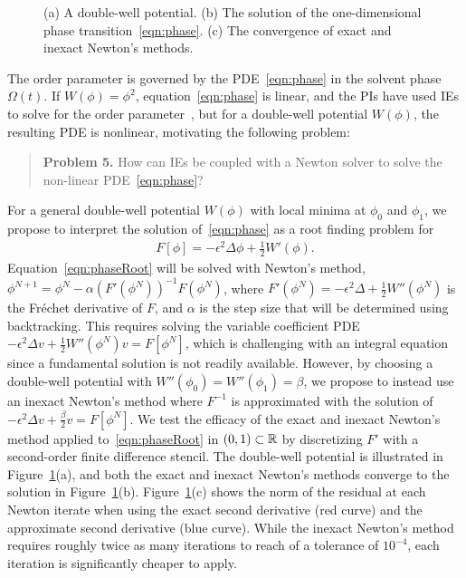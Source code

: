\begin{figure}
  \vspace{-8pt}
  \centering
   
  \caption{\label{fig:CA} \footnotesize (a) A double-well potential. (b)
  The solution of the one-dimensional phase
  transition~\eqref{eqn:phase}. (c) The convergence of exact and inexact
  Newton's methods.}
\end{figure}

The order parameter is governed by the PDE~\eqref{eqn:phase} in the
solvent phase $\Omega(t)$. If $W(\phi) = \phi^2$,
equation~\eqref{eqn:phase} is linear, and the PIs have used IEs to solve
for the order parameter~\cite{Fu2018_SIAM, FuQuRyYo22,
fu-ryh-qua-you2022}, but for a double-well potential $W(\phi)$, the
resulting PDE is nonlinear, motivating the following problem:

\begin{quotation}
  \noindent
  \textbf{Problem 5.} How can IEs be coupled with a Newton solver to
  solve the non-linear PDE~\eqref{eqn:phase}?
\end{quotation}

For a general double-well potential $W(\phi)$ with local minima at
$\phi_0$ and $\phi_1$, we propose to interpret the solution
of~\eqref{eqn:phase} as a root finding problem for
\begin{align}
  \label{eqn:phaseRoot}
  F[\phi] = -\epsilon^2 \Delta \phi + \tfrac{1}{2}W'(\phi).
\end{align}
Equation~\eqref{eqn:phaseRoot} will be solved with Newton's method,
$\phi^{N+1} = \phi^{N} - \alpha (F'(\phi^N))^{-1} F(\phi^N)$, where
$F'(\phi^N) = -\epsilon^2 \Delta + \tfrac{1}{2}W''(\phi^N)$ is the
Fr\'{e}chet derivative of $F$, and $\alpha$ is the step size that will
be determined using backtracking. This requires solving the variable
coefficient PDE $-\epsilon^2 \Delta v + \tfrac{1}{2}W''(\phi^{N}) v =
F[\phi^N]$, which is challenging with an integral equation since a
fundamental solution is not readily available. However, by choosing a
double-well potential with $W''(\phi_0) = W''(\phi_1) = \beta$, we
propose to instead use an inexact Newton's method where $F^{-1}$ is
approximated with the solution of $-\epsilon^2 \Delta v +
\tfrac{\beta}{2} v = F[\phi^N]$. We test the efficacy of the exact and
inexact Newton's method applied to~\eqref{eqn:phaseRoot} in $(0,1)
\subset \mathbb{R}$ by discretizing $F'$ with a second-order finite difference
stencil. The double-well potential is illustrated in
Figure~\ref{fig:CA}(a), and both the exact and inexact Newton's methods
converge to the solution in Figure~\ref{fig:CA}(b).
Figure~\ref{fig:CA}(c) shows the norm of the residual at each Newton
iterate when using the exact second derivative (red curve) and the
approximate second derivative (blue curve). While the inexact Newton's
method requires roughly twice as many iterations to reach of a tolerance
of $10^{-4}$, each iteration is significantly cheaper to apply.

